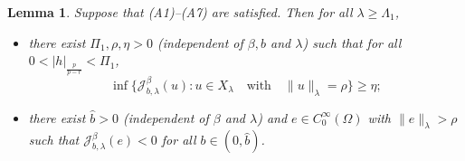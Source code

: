 \documentclass[10pt,a4paper]{amsart}
\numberwithin{equation}{section}
\newtheorem{lemma}[theorem]{Lemma}
\begin{document}
\begin{lemma}\label{L3.1} 
Suppose that {\rm (A1)--(A7)} are satisfied. Then for all $\lambda\geq\Lambda_1$,
\begin{itemize}
\item[(i)] there exist $\Pi_1, \rho, \eta>0$ (independent of $\beta, b$ and 
$\lambda$) such that for all $0<|h|_{\frac{p}{p-r}}<\Pi_1$,
$$
\inf \{\mathcal{J}^\beta_{b,\lambda}(u): u\in X_\lambda \quad \text{with}\quad
 \|u\|_\lambda=\rho \}\geq\eta;
$$

\item[(ii)] there exist $\widehat{b}>0$ (independent of $\beta$ and $\lambda$) and 
$e\in C_0^\infty(\Omega)$ with $\|e\|_\lambda>\rho$ such that 
$\mathcal{J}^\beta_{b,\lambda}(e)<0$ for all $b\in(0,\widehat{b})$.
\end{itemize}
\end{lemma}
\end{document}

